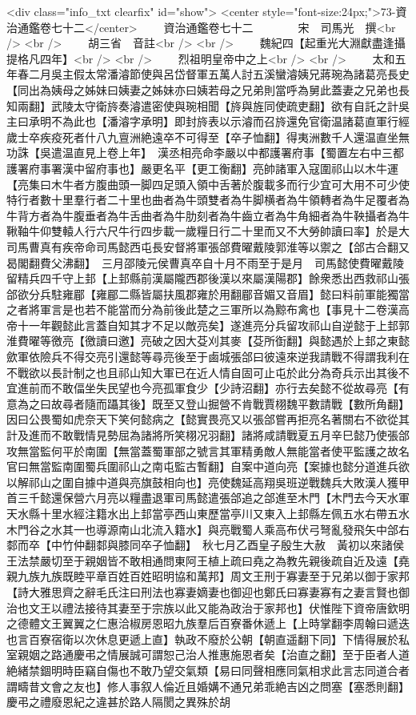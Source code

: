 <div class="info_txt clearfix" id="show">
<center style="font-size:24px;">73-資治通鑑卷七十二</center>
  　　資治通鑑卷七十二　　　　宋　司馬光　撰<br />
<br />
　　胡三省　音註<br />
<br />
　　魏紀四【起重光大淵獻盡逢攝提格凡四年】<br />
<br />
　　烈祖明皇帝中之上<br />
<br />
　　太和五年春二月吳主假太常潘濬節使與呂岱督軍五萬人討五溪蠻濬姨兄蔣琬為諸葛亮長史【同出為姨母之姊妹曰姨妻之姊妹亦曰姨若母之兄弟則當呼為舅此蓋妻之兄弟也長知兩翻】武陵太守衛旍奏濬遣密使與琬相聞【旍與旌同使疏吏翻】欲有自託之計吳主曰承明不為此也【潘濬字承明】即封旍表以示濬而召旍還免官衛温諸葛直軍行經歲士卒疾疫死者什八九亶洲絶遠卒不可得至【卒子恤翻】得夷洲數千人還温直坐無功誅【吳遣温直見上卷上年】　漢丞相亮命李嚴以中都護署府事【蜀置左右中三都護署府事署漢中留府事也】嚴更名平【更工衡翻】亮帥諸軍入寇圍祁山以木牛運【亮集曰木牛者方腹曲頭一脚四足頭入領中舌著於腹載多而行少宜可大用不可少使特行者數十里羣行者二十里也曲者為牛頭雙者為牛脚横者為牛領轉者為牛足覆者為牛背方者為牛腹垂者為牛舌曲者為牛肋刻者為牛齒立者為牛角細者為牛鞅攝者為牛鞦䩜牛仰雙轅人行六尺牛行四步載一歲糧日行二十里而又不大勞帥讀曰率】於是大司馬曹真有疾帝命司馬懿西屯長安督將軍張郃費曜戴陵郭淮等以禦之【郃古合翻又曷閣翻費父沸翻】　三月邵陵元侯曹真卒自十月不雨至于是月　司馬懿使費曜戴陵留精兵四千守上邽【上邽縣前漢屬隴西郡後漢以來屬漢陽郡】餘衆悉出西救祁山張郃欲分兵駐雍郿【雍郿二縣皆屬扶風郡雍於用翻郿音媚又音眉】懿曰料前軍能獨當之者將軍言是也若不能當而分為前後此楚之三軍所以為黥布禽也【事見十二卷漢高帝十一年觀懿此言蓋自知其才不足以敵亮矣】遂進亮分兵留攻祁山自逆懿于上邽郭淮費曜等徼亮【徼讀曰邀】亮破之因大芟刈其麥【芟所衘翻】與懿遇於上邽之東懿歛軍依險兵不得交亮引還懿等尋亮後至于鹵城張郃曰彼遠來逆我請戰不得謂我利在不戰欲以長計制之也且祁山知大軍已在近人情自固可止屯於此分為奇兵示出其後不宜進前而不敢偪坐失民望也今亮孤軍食少【少詩沼翻】亦行去矣懿不從故尋亮【有意為之曰故尋者隨而躡其後】既至又登山掘營不肯戰賈栩魏平數請戰【數所角翻】因曰公畏蜀如虎奈天下笑何懿病之【懿實畏亮又以張郃嘗再拒亮名著關右不欲從其計及進而不敢戰情見勢屈為諸將所笑栩况羽翻】諸將咸請戰夏五月辛巳懿乃使張郃攻無當監何平於南圍【無當蓋蜀軍部之號言其軍精勇敵人無能當者使平監護之故名官曰無當監南圍蜀兵圍祁山之南屯監古暫翻】自案中道向亮【案據也懿分道進兵欲以解祁山之圍自據中道與亮旗鼓相向也】亮使魏延高翔吳班逆戰魏兵大敗漢人獲甲首三千懿還保營六月亮以糧盡退軍司馬懿遣張郃追之郃進至木門【木門去今天水軍天水縣十里水經注籍水出上邽當亭西山東歷當亭川又東入上邽縣左佩五水右帶五水木門谷之水其一也導源南山北流入籍水】與亮戰蜀人乘高布伏弓弩亂發飛矢中郃右䣛而卒【中竹仲翻䣛與膝同卒子恤翻】　秋七月乙酉皇子殷生大赦　黃初以來諸侯王法禁嚴切至于親姻皆不敢相通問東阿王植上疏曰堯之為教先親後疏自近及遠【堯親九族九族既睦平章百姓百姓昭明協和萬邦】周文王刑于寡妻至于兄弟以御于家邦【詩大雅思齊之辭毛氏注曰刑法也寡妻嫡妻也御迎也鄭氏曰寡妻寡有之妻言賢也御治也文王以禮法接待其妻至于宗族以此又能為政治于家邦也】伏惟陛下資帝唐欽明之德體文王翼翼之仁惠洽椒房恩昭九族羣后百寮番休遞上【上時掌翻李周翰曰遞迭也言百寮宿衛以次休息更遞上直】執政不廢於公朝【朝直遥翻下同】下情得展於私室親姻之路通慶弔之情展誠可謂恕己治人推惠施恩者矣【治直之翻】至于臣者人道絶緒禁錮明時臣竊自傷也不敢乃望交氣類【易曰同聲相應同氣相求此言志同道合者謂疇昔文會之友也】修人事叙人倫近且婚媾不通兄弟乖絶吉凶之問塞【塞悉則翻】慶弔之禮廢恩紀之違甚於路人隔閡之異殊於胡